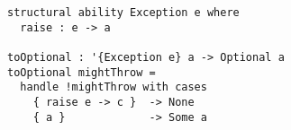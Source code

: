 \begin{algorithm}

\begin{verbatim}
structural ability Exception e where
  raise : e -> a

toOptional : '{Exception e} a -> Optional a
toOptional mightThrow =
  handle !mightThrow with cases
    { raise e -> c }  -> None
    { a }             -> Some a
\end{verbatim}

\caption{Exception ability and handler in Unison %
\label{alg-eff:unison-exc}}
\end{algorithm}